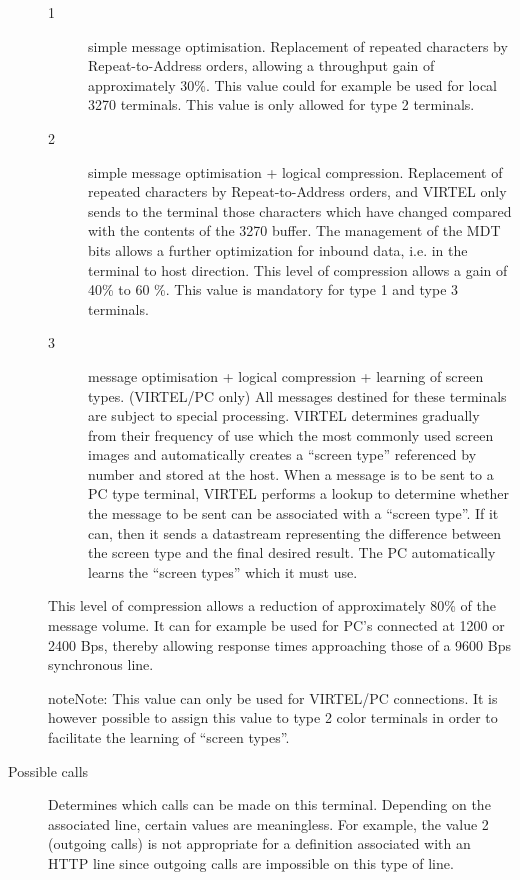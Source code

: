 \documentclass[letterpaper,10pt,english]{sphinxmanual}
\begin{document}
\begin{description}
\begin{description}
\item[{1}] \leavevmode
simple message optimisation.
Replacement of repeated characters by Repeat-to-Address orders, allowing a throughput gain of approximately 30\%. This value could for example be used for local 3270 terminals.
This value is only allowed for type 2 terminals.

\item[{2}] \leavevmode
simple message optimisation + logical compression.
Replacement of repeated characters by Repeat-to-Address orders, and VIRTEL only sends to the terminal those characters which have changed compared with the contents of the 3270 buffer. The management of the MDT bits allows a further
optimization for inbound data, i.e. in the terminal to host direction. This level of compression allows a gain of 40\% to 60 \%. This value is mandatory for type 1 and type 3 terminals.

\item[{3}] \leavevmode
message optimisation + logical compression + learning of screen types. (VIRTEL/PC only)
All messages destined for these terminals are subject to special processing. VIRTEL determines gradually from their frequency of use which the most commonly used screen images and automatically creates a “screen type” referenced by number and stored at the host. When a message is to be sent to a PC type terminal, VIRTEL performs a lookup to determine whether the message to be sent can be associated with a “screen type”. If it can, then it sends a datastream representing the difference between the screen type and the final desired result. The PC automatically learns the “screen types” which it must use.

\end{description}

This level of compression allows a reduction of approximately 80\% of the message volume. It can for example be used for PC’s connected at 1200 or 2400 Bps, thereby allowing response times approaching those of a 9600 Bps synchronous line.

\begin{sphinxadmonition}{note}{Note:}
This value can only be used for VIRTEL/PC connections. It is however possible to assign this value to type 2 color terminals in order to facilitate the learning of “screen types”.
\end{sphinxadmonition}

\item[{Possible calls}] \leavevmode
Determines which calls can be made on this terminal. Depending on the associated line, certain values are meaningless. For example, the value 2 (outgoing calls) is not appropriate for a definition associated with an HTTP line since outgoing calls are impossible on this type of line.


\end{description}
\end{document}
